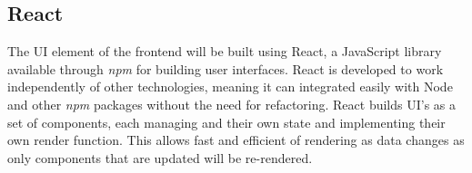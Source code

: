 \subsection{React}
The UI element of the frontend will be built using React, a JavaScript library available through \textit{npm} for building user interfaces. React is developed to work independently of other technologies, meaning it can integrated easily with Node and other \textit{npm} packages without the need for refactoring. React builds UI's as a set of components, each managing and their own state and implementing their own render function. This allows fast and efficient of rendering as data changes as only components that are updated will be re-rendered.

